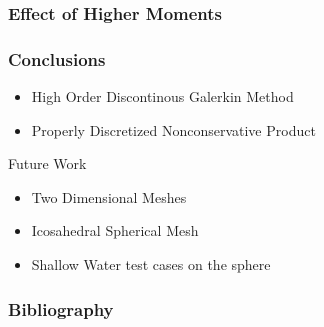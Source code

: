 \documentclass[10pt]{beamer}
\begin{document}
    \begin{frame}
        \frametitle{Effect of Higher Moments}

    \end{frame}

    \begin{frame}
      \frametitle{Conclusions}
      \begin{itemize}
        \item High Order Discontinous Galerkin Method
        \item Properly Discretized Nonconservative Product
      \end{itemize}
      Future Work
      \begin{itemize}
        \item Two Dimensional Meshes
        \item Icosahedral Spherical Mesh
        \item Shallow Water test cases on the sphere
      \end{itemize}
    \end{frame}

    \begin{frame}[allowframebreaks]
      \frametitle{Bibliography}
      \nocite{*}
      \printbibliography{}
    \end{frame}
\end{document}
